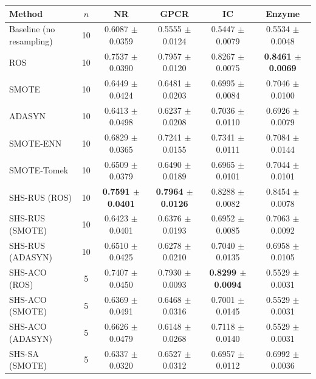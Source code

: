 \begin{tabular}{lccccc}
\toprule
Method & $n$ & NR & GPCR & IC & Enzyme \\
\midrule
Baseline (no resampling) & 10 & 0.6087 $\pm$ 0.0359 & 0.5555 $\pm$ 0.0124 & 0.5447 $\pm$ 0.0079 & 0.5534 $\pm$ 0.0048 \\
ROS & 10 & 0.7537 $\pm$ 0.0390 & 0.7957 $\pm$ 0.0120 & 0.8267 $\pm$ 0.0075 & \textbf{0.8461 $\pm$ 0.0069} \\
SMOTE & 10 & 0.6449 $\pm$ 0.0424 & 0.6481 $\pm$ 0.0203 & 0.6995 $\pm$ 0.0084 & 0.7046 $\pm$ 0.0100 \\
ADASYN & 10 & 0.6413 $\pm$ 0.0498 & 0.6237 $\pm$ 0.0208 & 0.7036 $\pm$ 0.0110 & 0.6926 $\pm$ 0.0079 \\
SMOTE-ENN & 10 & 0.6829 $\pm$ 0.0365 & 0.7241 $\pm$ 0.0155 & 0.7341 $\pm$ 0.0111 & 0.7084 $\pm$ 0.0144 \\
SMOTE-Tomek & 10 & 0.6509 $\pm$ 0.0379 & 0.6490 $\pm$ 0.0189 & 0.6965 $\pm$ 0.0101 & 0.7044 $\pm$ 0.0101 \\
SHS-RUS (ROS) & 10 & \textbf{0.7591 $\pm$ 0.0401} & \textbf{0.7964 $\pm$ 0.0126} & 0.8288 $\pm$ 0.0082 & 0.8454 $\pm$ 0.0078 \\
SHS-RUS (SMOTE) & 10 & 0.6423 $\pm$ 0.0401 & 0.6376 $\pm$ 0.0193 & 0.6952 $\pm$ 0.0085 & 0.7063 $\pm$ 0.0092 \\
SHS-RUS (ADASYN) & 10 & 0.6510 $\pm$ 0.0425 & 0.6278 $\pm$ 0.0210 & 0.7040 $\pm$ 0.0135 & 0.6958 $\pm$ 0.0105 \\
SHS-ACO (ROS) & 5 & 0.7407 $\pm$ 0.0450 & 0.7930 $\pm$ 0.0093 & \textbf{0.8299 $\pm$ 0.0094} & 0.5529 $\pm$ 0.0031 \\
SHS-ACO (SMOTE) & 5 & 0.6369 $\pm$ 0.0491 & 0.6468 $\pm$ 0.0316 & 0.7001 $\pm$ 0.0145 & 0.5529 $\pm$ 0.0031 \\
SHS-ACO (ADASYN) & 5 & 0.6626 $\pm$ 0.0479 & 0.6148 $\pm$ 0.0268 & 0.7118 $\pm$ 0.0140 & 0.5529 $\pm$ 0.0031 \\
SHS-SA (SMOTE) & 5 & 0.6337 $\pm$ 0.0320 & 0.6527 $\pm$ 0.0312 & 0.6957 $\pm$ 0.0112 & 0.6992 $\pm$ 0.0036 \\
\bottomrule
\end{tabular}
